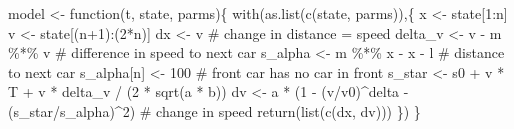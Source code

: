 \documentclass[
  a4paper,
  DIV=11,
  numbers=noendperiod,
  oneside]{scrreprt}
\newenvironment{Shaded}{}{}
\newcommand{\CommentTok}[1]{\textcolor[rgb]{0.42,0.45,0.49}{#1}}
\newcommand{\ControlFlowTok}[1]{\textcolor[rgb]{0.84,0.23,0.29}{#1}}
\newcommand{\DecValTok}[1]{\textcolor[rgb]{0.00,0.36,0.77}{#1}}
\newcommand{\FunctionTok}[1]{\textcolor[rgb]{0.44,0.26,0.76}{#1}}
\newcommand{\NormalTok}[1]{\textcolor[rgb]{0.14,0.16,0.18}{#1}}
\newcommand{\OtherTok}[1]{\textcolor[rgb]{0.44,0.26,0.76}{#1}}
\newcommand{\SpecialCharTok}[1]{\textcolor[rgb]{0.00,0.36,0.77}{#1}}
\begin{document}
\begin{Shaded}
\begin{Highlighting}[]
\NormalTok{model }\OtherTok{\textless{}{-}} \ControlFlowTok{function}\NormalTok{(t, state, parms)\{}
  \FunctionTok{with}\NormalTok{(}\FunctionTok{as.list}\NormalTok{(}\FunctionTok{c}\NormalTok{(state, parms)),\{}
\NormalTok{    x }\OtherTok{\textless{}{-}}\NormalTok{ state[}\DecValTok{1}\SpecialCharTok{:}\NormalTok{n]}
\NormalTok{    v }\OtherTok{\textless{}{-}}\NormalTok{ state[(n}\SpecialCharTok{+}\DecValTok{1}\NormalTok{)}\SpecialCharTok{:}\NormalTok{(}\DecValTok{2}\SpecialCharTok{*}\NormalTok{n)]}
\NormalTok{    dx }\OtherTok{\textless{}{-}}\NormalTok{  v }\CommentTok{\# change in distance = speed}
\NormalTok{    delta\_v }\OtherTok{\textless{}{-}}\NormalTok{ v }\SpecialCharTok{{-}}\NormalTok{ m }\SpecialCharTok{\%*\%}\NormalTok{ v }\CommentTok{\# difference in speed to next car}
\NormalTok{    s\_alpha }\OtherTok{\textless{}{-}}\NormalTok{ m }\SpecialCharTok{\%*\%}\NormalTok{ x }\SpecialCharTok{{-}}\NormalTok{ x }\SpecialCharTok{{-}}\NormalTok{ l }\CommentTok{\#  distance to next car}
\NormalTok{    s\_alpha[n] }\OtherTok{\textless{}{-}} \DecValTok{100} \CommentTok{\# front car has no car in front}
\NormalTok{    s\_star }\OtherTok{\textless{}{-}}\NormalTok{ s0 }\SpecialCharTok{+}\NormalTok{ v }\SpecialCharTok{*}\NormalTok{ T }\SpecialCharTok{+}\NormalTok{ v }\SpecialCharTok{*}\NormalTok{ delta\_v }\SpecialCharTok{/}\NormalTok{ (}\DecValTok{2} \SpecialCharTok{*} \FunctionTok{sqrt}\NormalTok{(a }\SpecialCharTok{*}\NormalTok{ b))}
\NormalTok{    dv }\OtherTok{\textless{}{-}}\NormalTok{ a }\SpecialCharTok{*}\NormalTok{ (}\DecValTok{1} \SpecialCharTok{{-}}\NormalTok{ (v}\SpecialCharTok{/}\NormalTok{v0)}\SpecialCharTok{\^{}}\NormalTok{delta }\SpecialCharTok{{-}}\NormalTok{ (s\_star}\SpecialCharTok{/}\NormalTok{s\_alpha)}\SpecialCharTok{\^{}}\DecValTok{2}\NormalTok{) }\CommentTok{\# change in speed}
    \FunctionTok{return}\NormalTok{(}\FunctionTok{list}\NormalTok{(}\FunctionTok{c}\NormalTok{(dx, dv)))}
\NormalTok{  \})}
\NormalTok{\}}


\end{Highlighting}
\end{Shaded}
\end{document}
